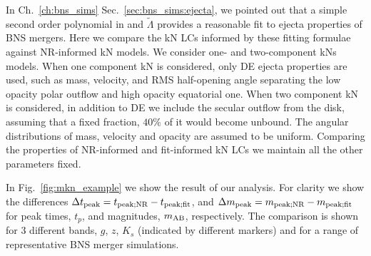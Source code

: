 

%
In Ch.~\ref{ch:bns_sims} Sec.~\ref{sec:bns_sims:ejecta}, we pointed out that a 
simple second order polynomial in \mr{} and $\tilde{\Lambda}$ provides a reasonable fit to 
ejecta properties of \ac{BNS} mergers. 
%
%
%
%
Here we compare the \ac{kN} \acp{LC} informed by these fitting 
formulae against \ac{NR}-informed \ac{kN} models. 
We consider one- and two-component \acp{kN} models. 
%
%
When one component \ac{kN} is considered, only \ac{DE} ejecta properties are used, 
such as mass, velocity, and \ac{RMS} half-opening angle separating the low opacity 
polar outflow and high opacity equatorial one. 
When two component \ac{kN} is considered, in addition to \ac{DE} we include the 
secular outflow from the disk, assuming that a fixed fraction, $40\%$ of it would 
become unbound. 
%
The angular distributions of mass, velocity and opacity
are assumed to be uniform. 
Comparing the properties of \ac{NR}-informed and fit-informed \ac{kN} \acp{LC} we 
maintain all the other parameters fixed.
%

In Fig.~\ref{fig:mkn_example} we show the result of our analysis. For clarity we 
show the differences $\Delta t_{\rm peak} = t_{\rm peak; NR} - t_{\rm peak; fit}$, 
and $\Delta m_{\rm peak} = m_{\rm peak; NR} - m_{\rm peak; fit}$ for peak times, 
$t_p$, and magnitudes, $m_{\rm AB}$, respectively. 
The comparison is shown for $3$ different bands, $g$, $z$, $K_s$ (indicated by 
different markers) and for a range of representative \ac{BNS} merger simulations.


